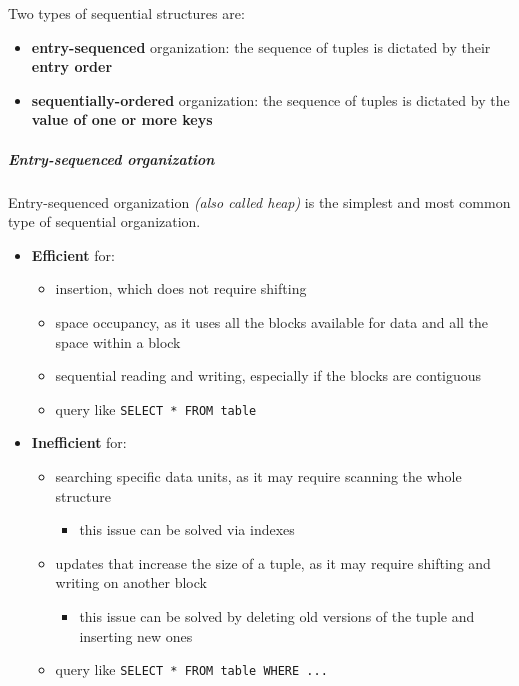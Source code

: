 \documentclass[english]{article}
\begin{document}
Two types of sequential structures are:

\begin{itemize}
  \item \textbf{entry-sequenced} organization: the sequence of tuples is dictated by their \textbf{entry order}
  \item \textbf{sequentially-ordered} organization: the sequence of tuples is dictated by the \textbf{value of one or more keys}
\end{itemize}

\subparagraph*{Entry-sequenced organization} Entry-sequenced organization \textit{(also called heap)} is the simplest and most common type of sequential organization.

\begin{itemize}
  \item \textbf{Efficient} for:
        \begin{itemize}[label=\cmarkthin]
          \item insertion, which does not require shifting
          \item space occupancy, as it uses all the blocks available for data and all the space within a block
          \item sequential reading and writing, especially if the blocks are contiguous
          \item query like \texttt{SELECT * FROM table}
        \end{itemize}
  \item \textbf{Inefficient} for:
        \begin{itemize}[label=\xmarkthin]
          \item searching specific data units, as it may require scanning the whole structure
                \begin{itemize}[label=\(\rightarrow\)]
                  \item this issue can be solved via indexes
                \end{itemize}
          \item updates that increase the size of a tuple, as it may require shifting and writing on another block
                \begin{itemize}[label=\(\rightarrow\)]
                  \item this issue can be solved by deleting old versions of the tuple and inserting new ones
                \end{itemize}
          \item query like \texttt{SELECT * FROM table WHERE ...}
        \end{itemize}
\end{itemize}
\end{document}
